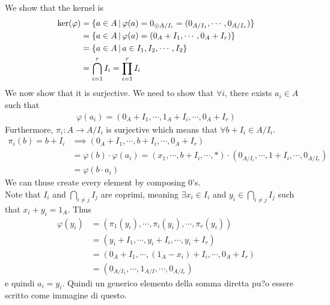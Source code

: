 \documentclass[a4paper]{article}
\begin{document}
\begin{snippetproof}{}
    We show that the kernel is
    \begin{align*}
        \text{ker}(\varphi) &= \{
            a \in A \,|\, \varphi(a) = 0_{\oplus A/I_i} =
            (0_{A/I_1}, \cdots, 0_{A/I_r})
        \} \\
        &= \{
            a \in A \,|\, \varphi(a) = (0_A + I_1, \cdots, 0_A + I_r)
        \} \\
        &= \{
            a \in A \,|\, a \in I_1, I_2, \cdots, I_2
        \} \\
        &= \bigcap_{i=1}^r I_i = \prod_{i=1}^r I_i
    \end{align*}
    We now show that it is surjective. We need to show that \(\forall
    i\), there exists \(a_i \in A\)
    such that
    \begin{align*}
        \varphi(a_i) = (0_A + I_1, \cdots, 1_A + I_i, \cdots, 0_A + I_r)
    \end{align*}
    Furthermore, \(\pi_i \colon A \to A/I_i\) is surjective
    which means that \(\forall b + I_i \in A/I_i\).
    \begin{align*}
        \pi_i(b) = b+I_i &\implies (0_A + I_1, \cdots, b + I_i,
        \cdots, 0_A + I_r) \\
        &= \varphi(b) \cdot \varphi(a_i) = (x_1, \cdots, b + I_i, \cdots, \ast)
        \cdot (0_{A/I_i}, \cdots, 1 + I_i, \cdots, 0_{A/I_r}) \\
        &= \varphi(b \cdot a_i)
    \end{align*}
    We can thuse create every element by composing \(0\)'s. \\
    Note that \(I_i\) and \(\bigcap_{i\neq j} I_j\) are coprimi,
    meaning \(\exists x_i \in I_i\)
    and \(y_i \in \bigcap_{i\neq j} I_j\) such that \(x_i + y_i = 1_A\).
    Thus
    \begin{align*}
        \varphi(y_i) &= (\pi_1(y_i), \cdots, \pi_i(y_i), \cdots, \pi_r(y_i)) \\
        &= (y_i + I_1, \cdots, y_i + I_i, \cdots, y_i + I_r) \\
        &= (0_A + I_1, \cdots, (1_A - x_i) + I_i, \cdots, 0_A + I_r) \\
        &= (0_{A/I_1}, \cdots, 1_{A/I}, \cdots, 0_{A/I_r})
    \end{align*}
    e quindi \(a_i = y_i\).
    Quindi un generico elemento della somma diretta pu?o essere
    scritto come immagine di questo.
\end{snippetproof}
\end{document}

